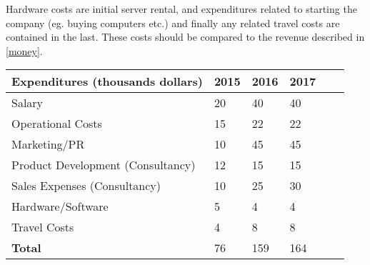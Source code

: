 \documentclass[12pt]{article}
\begin{document}
Hardware costs are initial server rental, and expenditures related to starting the company (eg. buying computers etc.) and finally any related travel costs are contained in the last. These costs should be compared to the revenue described in \ref{money}.

\begin{center}
\begin{tabular}{l*{4}{l}l}
Expenditures (thousands dollars)							& 2015 & 2016 & 2017\\			
\hline
Salary 									 					& 20 	& 40 	& 40\\
Operational Costs					 						& 15 	& 22 	& 22\\
Marketing/PR 		 		 								& 10 	& 45 	& 45\\
Product Development (Consultancy)							& 12 	& 15 	& 15\\
Sales Expenses (Consultancy) 								& 10 	& 25	& 30\\
Hardware/Software											& 5 	& 4 	& 4\\
Travel Costs 												& 4 	& 8		& 8\\
\hline
\textbf{Total} 												& 76 	& 159 	& 164
\end{tabular}
\end{center}
\end{document}
